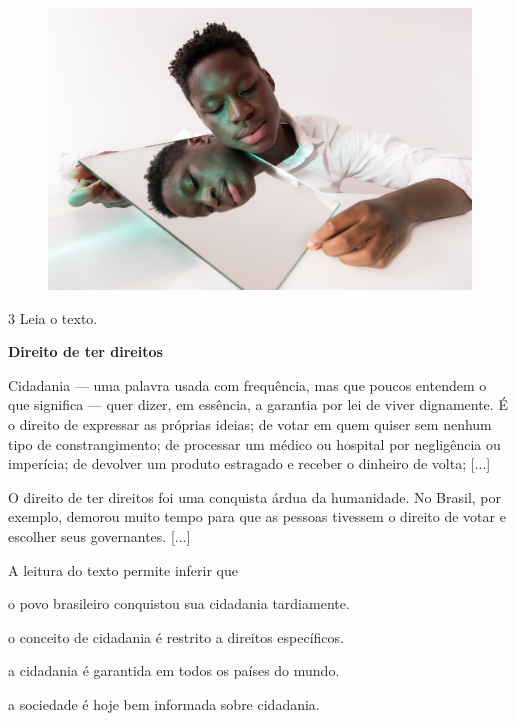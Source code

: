 \begin{figure}[H]
\centering
\includegraphics[width=\textwidth]{./imgSAEB_8_POR/media/image44.png}
\end{figure}

\num{3} Leia o texto.

\begin{myquote}
\centering\textbf{Direito de ter direitos}

Cidadania --- uma palavra usada com frequência, mas que poucos entendem
o que significa --- quer dizer, em essência, a garantia por lei de viver
dignamente. É o direito de expressar as próprias ideias; de votar em
quem quiser sem nenhum tipo de constrangimento; de processar um médico
ou hospital por negligência ou imperícia; de devolver um produto
estragado e receber o dinheiro de volta; {[}...{]}

O direito de ter direitos foi uma conquista árdua da humanidade. No
Brasil, por exemplo, demorou muito tempo para que as pessoas tivessem o
direito de votar e escolher seus governantes. {[}...{]}

\end{myquote}

A leitura do texto permite inferir que

\begin{escolha}
\item o povo brasileiro conquistou sua cidadania tardiamente.

\item o conceito de cidadania é restrito a direitos específicos.

\item a cidadania é garantida em todos os países do mundo.

\item a sociedade é hoje bem informada sobre cidadania.
\end{escolha}

